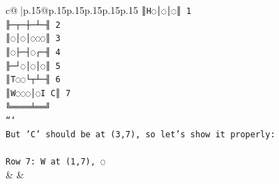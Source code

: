 \documentclass{article}
\begin{document}
{\begin{supertabular}{c@{$\;$}|p{.15\linewidth}@{}p{.15\linewidth}p{.15\linewidth}p{.15\linewidth}p{.15\linewidth}p{.15\linewidth}}
{{{\texttt{║H◌│◌│◌║ 1} \\
\texttt{╟─┬─┼─┴─╢ 2} \\
\texttt{║◌│◌│◌◌◌║ 3} \\
\texttt{║◌├─┤◌┌─╢ 4} \\
\texttt{╟─┘◌│◌│◌║ 5} \\
\texttt{║T◌◌└┬┴─╢ 6} \\
\texttt{║W◌◌◌│◌I C║ 7} \\
\texttt{╚════╧══╝} \\
\texttt{```} \\
\texttt{But 'C' should be at (3,7), so let's show it properly:} \\
\\ 
\texttt{Row 7: W at (1,7), ◌} \\
            }
        }
    }
    & & \\ \\


\end{supertabular}}
\end{document}
